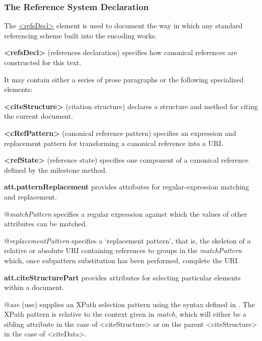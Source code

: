 \subsubsection[{The Reference System Declaration}]{The Reference System Declaration}\label{HD54}\par
The \hyperref[TEI.refsDecl]{<refsDecl>} element is used to document the way in which any standard referencing scheme built into the encoding works. 
\begin{sansreflist}
  
\item [\textbf{<refsDecl>}] (references declaration) specifies how canonical references are constructed for this text.
\end{sansreflist}
 It may contain either a series of prose paragraphs or the following specialized elements: 
\begin{sansreflist}
  
\item [\textbf{<citeStructure>}] (citation structure) declares a structure and method for citing the current document.
\item [\textbf{<cRefPattern>}] (canonical reference pattern) specifies an expression and replacement pattern for transforming a canonical reference into a URI.
\item [\textbf{<refState>}] (reference state) specifies one component of a canonical reference defined by the milestone method.
\item [\textbf{att.patternReplacement}] provides attributes for regular-expression matching and replacement.\hfil\\[-10pt]\begin{sansreflist}
    \item[@{\itshape matchPattern}]
  specifies a regular expression against which the values of other attributes can be matched.
    \item[@{\itshape replacementPattern}]
  specifies a ‘replacement pattern’, that is, the skeleton of a relative or absolute URI containing references to groups in the {\itshape matchPattern} which, once subpattern substitution has been performed, complete the URI.
\end{sansreflist}  
\item [\textbf{att.citeStructurePart}] provides attributes for selecting particular elements within a document.\hfil\\[-10pt]\begin{sansreflist}
    \item[@{\itshape use}]
  (use) supplies an XPath selection pattern using the syntax defined in \cite{XSLT3}. The XPath pattern is relative to the context given in {\itshape match}, which will either be a sibling attribute in the case of <citeStructure> or on the parent <citeStructure> in the case of <citeData>.
\end{sansreflist}  
\end{sansreflist}
